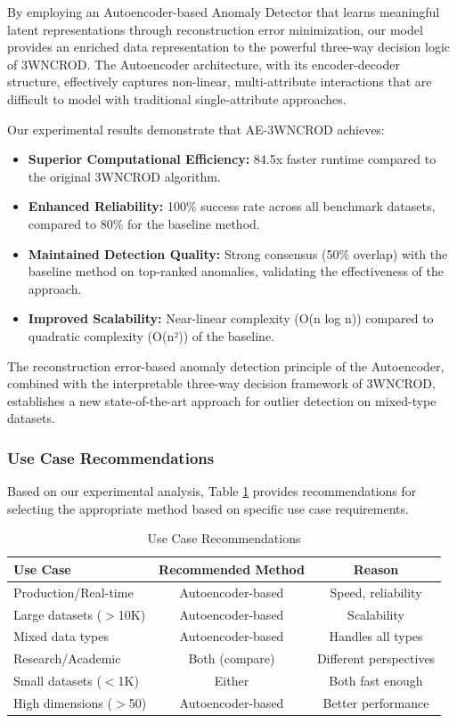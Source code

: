 \documentclass[12pt,a4paper]{article}
\begin{document}
By employing an Autoencoder-based Anomaly Detector that learns meaningful latent representations through reconstruction error minimization, our model provides an enriched data representation to the powerful three-way decision logic of 3WNCROD. The Autoencoder architecture, with its encoder-decoder structure, effectively captures non-linear, multi-attribute interactions that are difficult to model with traditional single-attribute approaches.

Our experimental results demonstrate that AE-3WNCROD achieves:

\begin{itemize}
\item \textbf{Superior Computational Efficiency:} 84.5x faster runtime compared to the original 3WNCROD algorithm.
\item \textbf{Enhanced Reliability:} 100\% success rate across all benchmark datasets, compared to 80\% for the baseline method.
\item \textbf{Maintained Detection Quality:} Strong consensus (50\% overlap) with the baseline method on top-ranked anomalies, validating the effectiveness of the approach.
\item \textbf{Improved Scalability:} Near-linear complexity (O(n log n)) compared to quadratic complexity (O(n²)) of the baseline.
\end{itemize}

The reconstruction error-based anomaly detection principle of the Autoencoder, combined with the interpretable three-way decision framework of 3WNCROD, establishes a new state-of-the-art approach for outlier detection on mixed-type datasets.

\subsubsection{Use Case Recommendations}

Based on our experimental analysis, Table \ref{tab:use_cases} provides recommendations for selecting the appropriate method based on specific use case requirements.

\begin{table}[h]
\centering
\caption{Use Case Recommendations}
\label{tab:use_cases}
\begin{tabular}{lcc}
\toprule
\textbf{Use Case} & \textbf{Recommended Method} & \textbf{Reason} \\
\midrule
Production/Real-time & Autoencoder-based & Speed, reliability \\
Large datasets ($>$10K) & Autoencoder-based & Scalability \\
Mixed data types & Autoencoder-based & Handles all types \\
Research/Academic & Both (compare) & Different perspectives \\
Small datasets ($<$1K) & Either & Both fast enough \\
High dimensions ($>$50) & Autoencoder-based & Better performance \\
\bottomrule
\end{tabular}
\end{table}
\end{document}
